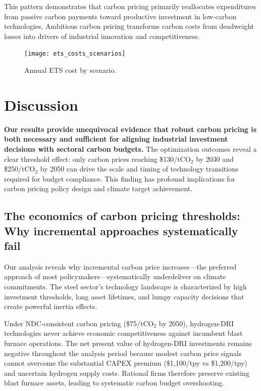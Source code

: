 \documentclass[preprint,5p,authoryear]{elsarticle}
\begin{document}
This pattern demonstrates that carbon pricing primarily reallocates expenditures from passive carbon payments toward productive investment in low-carbon technologies. Ambitious carbon pricing transforms carbon costs from deadweight losses into drivers of industrial innovation and competitiveness.

\begin{figure}[!t]
  \centering
  \texttt{[image: ets\_costs\_scenarios]}
  \caption{Annual ETS cost by scenario.}
  \label{fig:ets-scenarios}
\end{figure}


\section{Discussion}

\textbf{Our results provide unequivocal evidence that robust carbon pricing is both necessary and sufficient for aligning industrial investment decisions with sectoral carbon budgets.} The optimization outcomes reveal a clear threshold effect: only carbon prices reaching \$130/tCO$_2$ by 2030 and \$250/tCO$_2$ by 2050 can drive the scale and timing of technology transitions required for budget compliance. This finding has profound implications for carbon pricing policy design and climate target achievement.

\subsection{The economics of carbon pricing thresholds: Why incremental approaches systematically fail}

Our analysis reveals why incremental carbon price increases—the preferred approach of most policymakers—systematically underdeliver on climate commitments. The steel sector's technology landscape is characterized by high investment thresholds, long asset lifetimes, and lumpy capacity decisions that create powerful inertia effects.

Under NDC-consistent carbon pricing (\$75/tCO$_2$ by 2050), hydrogen-DRI technologies never achieve economic competitiveness against incumbent blast furnace operations. The net present value of hydrogen-DRI investments remains negative throughout the analysis period because modest carbon price signals cannot overcome the substantial CAPEX premium (\$1,100/tpy vs \$1,200/tpy) and uncertain hydrogen supply costs. Rational firms therefore preserve existing blast furnace assets, leading to systematic carbon budget overshooting.
\end{document}

